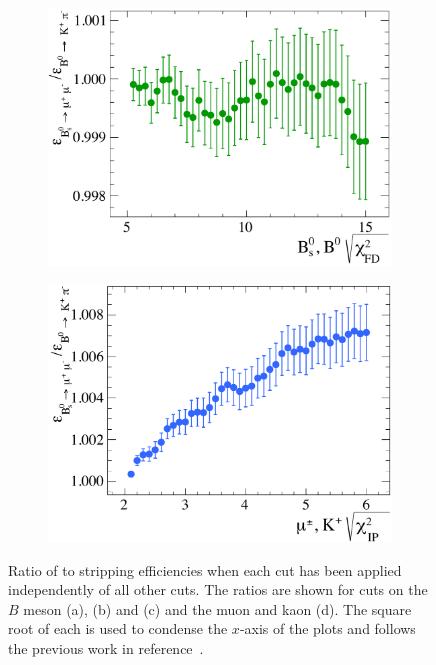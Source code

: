 \begin{figure}[p]
\begin{subfigure}[b]{0.48\textwidth}
    \includegraphics[width=\textwidth]{./Figs/Selection/Bd2KPi_FD.pdf}
    \caption{}
    \label{fig:KPiFD}
  \end{subfigure}
  \begin{subfigure}[b]{0.48\textwidth}
    \includegraphics[width=\textwidth]{./Figs/Selection/Bd2KPi_daugt_IP.pdf}
    \caption{}
    \label{fig:KPidaugtIP}
  \end{subfigure}
  \caption{Ratio of \bsmumu to \bdkpi stripping efficiencies when each cut has been applied independently of all other cuts. The ratios are shown for cuts on the $B$ meson \chiIP (a), \chivtx (b) and \chiFD (c) and the muon and kaon \chiIP (d). The square root of each \chisqd is used to condense the $x$-axis of the plots and follows the previous work in reference~\cite{Diego}.}
  \label{fig:BKPi}
\end{figure}

